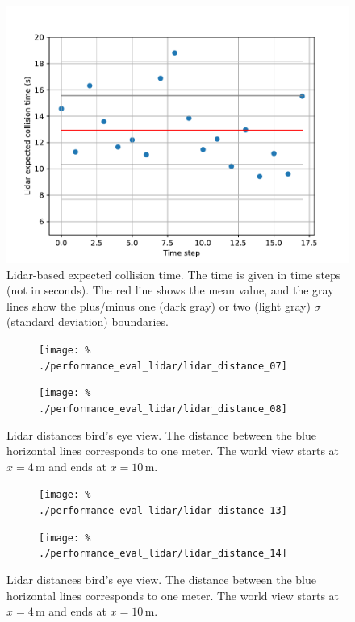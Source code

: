 \documentclass[a4paper]{scrartcl}
\begin{document}
\begin{figure}
	\centering
	\includegraphics[width=0.8\columnwidth]{./img/lidar_ect}
	\caption{Lidar-based expected collision time. The time is given in time steps
			(not in seconds).
			The red line shows the mean value, and the gray lines
			show the plus/minus one (dark gray) or two (light gray)
			$\sigma$ (standard deviation)
			boundaries.}
	\label{fig:lidar_ect}
\end{figure}

\begin{figure}
	\centering
	\begin{subfigure}[c]{0.45\columnwidth}
		\texttt{[image: \%
			./performance\_eval\_lidar/lidar\_distance\_07]}
	\end{subfigure}
	\begin{subfigure}[c]{0.45\columnwidth}
		\texttt{[image: \%
			./performance\_eval\_lidar/lidar\_distance\_08]}
	\end{subfigure}
	\caption{Lidar distances bird's eye view.
			The distance between the blue horizontal
			lines corresponds to one meter.
			The world view starts at $x=4\,\text{m}$
			and ends at $x=10\,\text{m}$.}
	\label{fig:lidar_birds_eye_view_1}
\end{figure}

\begin{figure}
	\centering
	\begin{subfigure}[c]{0.45\columnwidth}
		\texttt{[image: \%
			./performance\_eval\_lidar/lidar\_distance\_13]}
	\end{subfigure}
	\begin{subfigure}[c]{0.45\columnwidth}
		\texttt{[image: \%
			./performance\_eval\_lidar/lidar\_distance\_14]}
	\end{subfigure}
	\caption{Lidar distances bird's eye view.
			The distance between the blue horizontal
			lines corresponds to one meter.
			The world view starts at $x=4\,\text{m}$
			and ends at $x=10\,\text{m}$.}
	\label{fig:lidar_birds_eye_view_2}
\end{figure}
\end{document}
